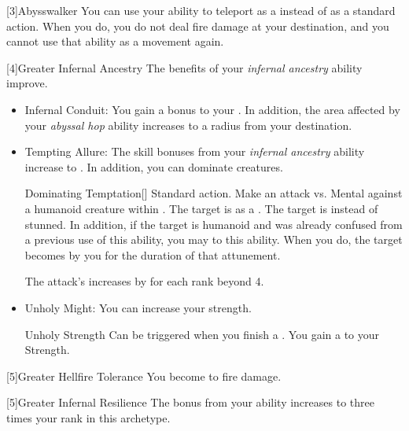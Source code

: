 [3]{Abysswalker} You can use your  ability to teleport as a  instead of as a standard action.
When you do, you do not deal fire damage at your destination, and you  cannot use that ability as a movement again.

[4]{Greater Infernal Ancestry} The benefits of your \textit{infernal ancestry} ability improve.
\begin{itemize}
	\item Infernal Conduit: You gain a  bonus to your .
	      In addition, the area affected by your \textit{abyssal hop} ability increases to a \smallarea radius from your destination.
	\item Tempting Allure: The skill bonuses from your \textit{infernal ancestry} ability increase to .
	      In addition, you can dominate creatures.
	      \begin{magicalactiveability}{Dominating Temptation}[]
		      \abilityusagetime Standard action.
		      \rankline
		      Make an attack vs. Mental against a humanoid creature within \shortrange.
		      \hit The target is \stunned as a .
		      \crit The target is \confused instead of stunned.
		      In addition, if the target is humanoid and was already confused from a previous use of this ability, you may  to this ability.
		      When you do, the target becomes \dominated by you for the duration of that attunement.

		      \rankline
		      \noindent The attack's  increases by  for each rank beyond 4.
	      \end{magicalactiveability}
	\item Unholy Might: You can increase your strength.
	      \begin{magicalattuneability}{Unholy Strength}{}
		      \abilityusagetime Can be triggered when you finish a .
		      \rankline
		      You gain a   to your Strength.
	      \end{magicalattuneability}
\end{itemize}

[5]{Greater Hellfire Tolerance} You become  to fire damage.

[5]{Greater Infernal Resilience}  The bonus from your  ability increases to three times your rank in this archetype.


